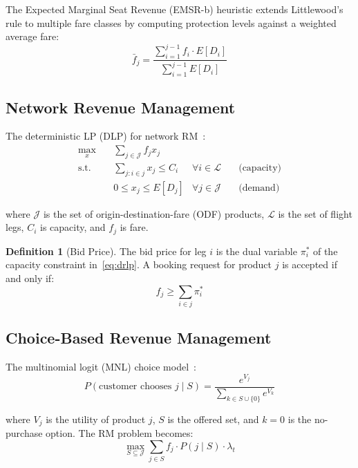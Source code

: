 \documentclass[11pt,a4paper]{book}
\theoremstyle{definition}
\newtheorem{definition}[theorem]{Definition}
\begin{document}
The Expected Marginal Seat Revenue (EMSR-b) heuristic extends Littlewood's
rule to multiple fare classes by computing protection levels against a
weighted average fare:
\begin{equation}
  \bar{f}_j = \frac{\sum_{i=1}^{j-1} f_i \cdot E[D_i]}{\sum_{i=1}^{j-1} E[D_i]}
\end{equation}

\subsection{Network Revenue Management}

The deterministic LP (DLP) for network RM~\cite{Williamson1992}:
\begin{align}
  \max_{x} \quad & \sum_{j \in \mathcal{J}} f_j x_j \label{eq:drlp} \\
  \text{s.t.} \quad & \sum_{j: i \in j} x_j \leq C_i
    & \forall i \in \mathcal{L} \quad & \text{(capacity)} \\
  & 0 \leq x_j \leq E[D_j]
    & \forall j \in \mathcal{J} \quad & \text{(demand)}
\end{align}

where $\mathcal{J}$ is the set of origin-destination-fare (ODF) products,
$\mathcal{L}$ is the set of flight legs, $C_i$ is capacity, and $f_j$ is fare.

\begin{definition}[Bid Price]
The bid price for leg $i$ is the dual variable $\pi_i^*$ of the capacity
constraint in~\eqref{eq:drlp}. A booking request for product $j$ is accepted
if and only if:
\begin{equation}
  f_j \geq \sum_{i \in j} \pi_i^*
\end{equation}
\end{definition}

\subsection{Choice-Based Revenue Management}

The multinomial logit (MNL) choice model~\cite{Talluri2004}:
\begin{equation}
  P(\text{customer chooses } j \mid S) = \frac{e^{V_j}}{\sum_{k \in S \cup \{0\}} e^{V_k}}
\end{equation}

where $V_j$ is the utility of product $j$, $S$ is the offered set, and
$k=0$ is the no-purchase option. The RM problem becomes:
\begin{equation}
  \max_{S \subseteq \mathcal{J}} \sum_{j \in S} f_j \cdot P(j \mid S)
    \cdot \lambda_t
\end{equation}
\end{document}
